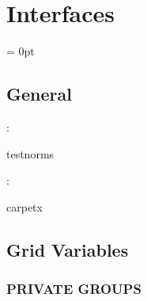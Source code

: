 
\section{Interfaces} 


\parskip = 0pt

\vspace{3mm} \subsection*{General}

: 

testnorms
\vspace{2mm}

: 

carpetx
\vspace{2mm}
\subsection*{Grid Variables}
\vspace{5mm}\subsubsection{PRIVATE GROUPS}

\vspace{5mm}

